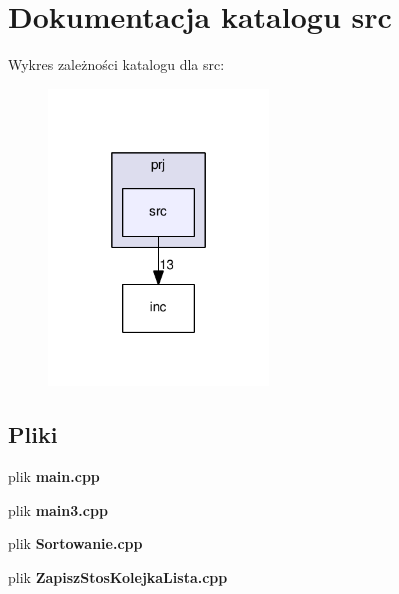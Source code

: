 \section{Dokumentacja katalogu src}
\label{dir_400757c3a0df52e783ed9699284f29ce}
Wykres zależności katalogu dla src\-:
\nopagebreak
\begin{figure}[H]
\begin{center}
\leavevmode
\includegraphics[width=166pt]{dir_400757c3a0df52e783ed9699284f29ce_dep}
\end{center}
\end{figure}
\subsection*{Pliki}
\begin{DoxyCompactItemize}
\item 
plik {\bf main.\-cpp}
\item 
plik {\bf main3.\-cpp}
\item 
plik {\bf Sortowanie.\-cpp}
\item 
plik {\bf Zapisz\-Stos\-Kolejka\-Lista.\-cpp}
\end{DoxyCompactItemize}
